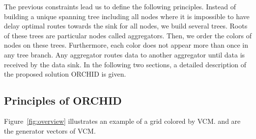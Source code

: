 The previous constraints lead us to define the following principles. 
Instead of building a unique spanning tree including all nodes where it is impossible to have delay optimal routes towards the sink for all nodes, we build several trees. Roots of these trees are particular nodes called aggregators. Then, we order the colors of nodes on these trees. Furthermore, each color does not appear more than once in any tree branch. Any aggregator routes data to another aggregator until data is received by the data sink. In the following two sections, a detailed description of the proposed solution ORCHID is given.


\subsection{Principles of ORCHID}
Figure~\ref{fig:overview} illustrates an example of a grid colored by VCM.  and  are the generator vectors of VCM.

